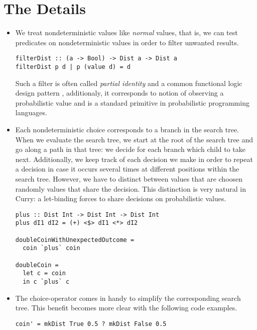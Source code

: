 \documentclass[
12pt, %
a4paper, %
oneside, %
]{llncs}
\begin{document}
\section{The Details}

\begin{itemize}

\item We treat nondeterministic values like \emph{normal} values, that
  is, we can test predicates on nondeterministic values in order to
  filter unwanted results. %

\begin{verbatim}
filterDist :: (a -> Bool) -> Dist a -> Dist a
filterDist p d | p (value d) = d
\end{verbatim}

  Such a filter is often called \emph{partial identity} and a common
  functional logic design pattern \cite{funcLogPattern}, additionaly,
  it corresponds to notion of observing a probabilistic value and is a
  standard primitive in probabilistic programming languages. %
 
\item Each nondeterministic choice corresponds to a branch in the
  search tree. %
  When we evaluate the search tree, we start at the root of the search
  tree and go along a path in that tree: we decide for each branch
  which child to take next. %
  Additionally, we keep track of each decision we make in order to
  repeat a decision in case it occurs several times at different
  positions within the search tree. %
  However, we have to distinct between values that are choosen
  randomly values that share the decision. %
  This distinction is very natural in Curry: a let-binding forces to
  share decisions on probabilistic values. %

\begin{verbatim}
plus :: Dist Int -> Dist Int -> Dist Int
plus dI1 dI2 = (+) <$> dI1 <*> dI2

doubleCoinWithUnexpectedOutcome =
  coin `plus` coin

doubleCoin =
  let c = coin
  in c `plus` c
\end{verbatim}

\item The choice-operator comes in handy to simplify the corresponding
  search tree. %
  This benefit becomes more clear with the following code examples. %

\begin{verbatim}
coin' = mkDist True 0.5 ? mkDist False 0.5


\end{verbatim}
\end{itemize}
\end{document}
